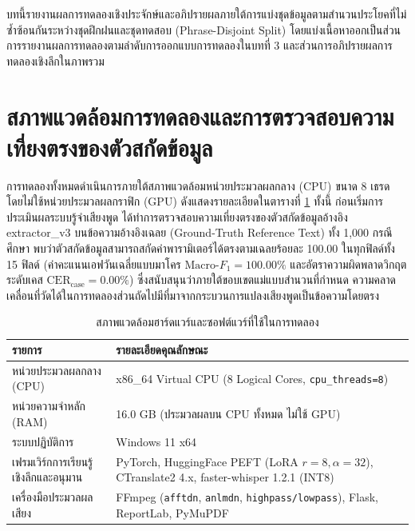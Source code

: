 \providecommand{\todo}[1]{\textbf{[TODO: #1]}}

บทนี้รายงานผลการทดลองเชิงประจักษ์และอภิปรายผลภายใต้การแบ่งชุดข้อมูลตามสำนวนประโยคที่ไม่ซ้ำซ้อนกันระหว่างชุดฝึกฝนและชุดทดสอบ (Phrase-Disjoint Split) โดยแบ่งเนื้อหาออกเป็นส่วนการรายงานผลการทดลองตามลำดับการออกแบบการทดลองในบทที่ 3 และส่วนการอภิปรายผลการทดลองเชิงลึกในภาพรวม

\section{สภาพแวดล้อมการทดลองและการตรวจสอบความเที่ยงตรงของตัวสกัดข้อมูล}
\label{sec:env}

การทดลองทั้งหมดดำเนินการภายใต้สภาพแวดล้อมหน่วยประมวลผลกลาง (CPU) ขนาด 8 เธรด โดยไม่ใช้หน่วยประมวลผลกราฟิก (GPU) ดังแสดงรายละเอียดในตารางที่ \ref{tab:env} ทั้งนี้ ก่อนเริ่มการประเมินผลระบบรู้จำเสียงพูด ได้ทำการตรวจสอบความเที่ยงตรงของตัวสกัดข้อมูลอ้างอิง extractor\_v3 บนข้อความอ้างอิงเฉลย (Ground-Truth Reference Text) ทั้ง 1,000 กรณีศึกษา พบว่าตัวสกัดข้อมูลสามารถสกัดค่าพารามิเตอร์ได้ตรงตามเฉลยร้อยละ 100.00 ในทุกฟิลด์ทั้ง 15 ฟิลด์ (ค่าคะแนนเอฟวันเฉลี่ยแบบมาโคร $\mathrm{Macro\text{-}}F_1 = 100.00\%$ และอัตราความผิดพลาดวิกฤตระดับเคส $\mathrm{CER}_{\mathrm{case}} = 0.00\%$) ซึ่งสนับสนุนว่าภายใต้ขอบเขตแม่แบบสำนวนที่กำหนด ความคลาดเคลื่อนที่วัดได้ในการทดลองส่วนถัดไปมีที่มาจากกระบวนการแปลงเสียงพูดเป็นข้อความโดยตรง

\begin{table}[H]
\centering
\caption{สภาพแวดล้อมฮาร์ดแวร์และซอฟต์แวร์ที่ใช้ในการทดลอง}
\label{tab:env}
\small
\begin{tabular}{|p{4.2cm}|p{8.6cm}|}
\hline
\textbf{รายการ} & \textbf{รายละเอียดคุณลักษณะ} \\
\hline
หน่วยประมวลผลกลาง (CPU) & x86\_64 Virtual CPU (8 Logical Cores, \texttt{cpu\_threads=8}) \\
\hline
หน่วยความจำหลัก (RAM) & 16.0 GB (ประมวลผลบน CPU ทั้งหมด ไม่ใช้ GPU) \\
\hline
ระบบปฏิบัติการ & Windows 11 x64 \\
\hline
เฟรมเวิร์กการเรียนรู้เชิงลึกและอนุมาน & PyTorch, HuggingFace PEFT (LoRA $r=8, \alpha=32$), CTranslate2 4.x, faster-whisper 1.2.1 (INT8) \\
\hline
เครื่องมือประมวลผลเสียง & FFmpeg (\texttt{afftdn}, \texttt{anlmdn}, \texttt{highpass/lowpass}), Flask, ReportLab, PyMuPDF \\
\hline
\end{tabular}
\end{table}

